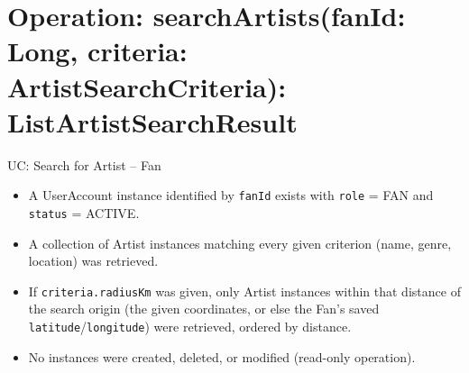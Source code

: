 \documentclass[11pt]{report}
\begin{document}

\section*{Operation: searchArtists(fanId: Long, criteria: ArtistSearchCriteria): List\textlangle ArtistSearchResult\textrangle}
\begin{description}[leftmargin=2.8cm, style=nextline]
  \item[Cross Reference] UC: Search for Artist -- Fan
  \item[Preconditions]
    \begin{itemize}
      \item A UserAccount instance identified by \texttt{fanId} exists with \texttt{role} = FAN and \texttt{status} = ACTIVE.
    \end{itemize}
  \item[Postconditions]
    \begin{itemize}
      \item A collection of Artist instances matching every given criterion (name, genre, location) was retrieved.
      \item If \texttt{criteria.radiusKm} was given, only Artist instances within that distance of the search origin (the given coordinates, or else the Fan's saved \texttt{latitude}/\texttt{longitude}) were retrieved, ordered by distance.
      \item No instances were created, deleted, or modified (read-only operation).
    \end{itemize}
\end{description}
\end{document}

